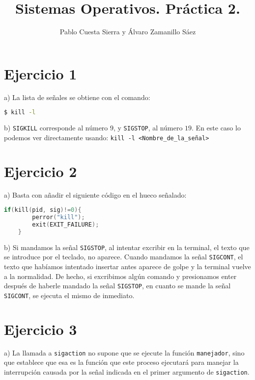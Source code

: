 \documentclass{article}
\title{Sistemas Operativos. Práctica 2.}
\author{Pablo Cuesta Sierra y Álvaro Zamanillo Sáez}
\begin{document}
\maketitle

\begin{tcolorbox}
\tableofcontents
\end{tcolorbox}



\section*{Ejercicio 1}
a) La lista de señales se obtiene con el comando: 

\begin{lstlisting}[language=bash]
$ kill -l
\end{lstlisting}

b) \texttt{SIGKILL} corresponde al número $9$, y \texttt{SIGSTOP}, al número $19$. En este caso lo podemos ver directamente usando: \texttt{kill -l <Nombre\_de\_la\_señal>}

\section*{Ejercicio 2}

a) Basta con añadir el siguiente código en el hueco señalado: 
\begin{lstlisting}[language=C]
    if(kill(pid, sig)!=0){
        perror("kill");
        exit(EXIT_FAILURE);
    }
\end{lstlisting}

b) Si mandamos la señal \texttt{SIGSTOP}, al intentar excribir en la terminal, el texto que se introduce por el teclado, no aparece. Cuando mandamos la señal \texttt{SIGCONT}, el texto que habíamos intentado insertar antes aparece de golpe y la terminal vuelve a la normalidad.
De hecho, si excribimos algún comando y presionamos enter después de haberle mandado la señal \texttt{SIGSTOP}, en cuanto se mande la señal \texttt{SIGCONT}, se ejecuta el mismo de inmediato.

\section*{Ejercicio 3}
a) La llamada a \texttt{sigaction} no supone que se ejecute la función \texttt{manejador}, sino que establece que esa es la función que este proceso ejecutará para manejar la interrupción causada por la señal indicada en el primer argumento de \texttt{sigaction}.
\end{document}
